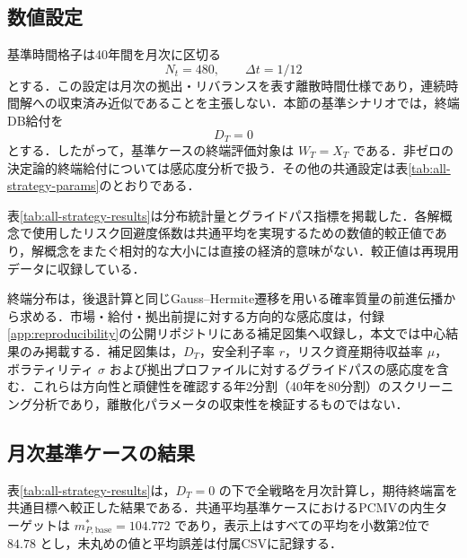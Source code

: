 \documentclass[10pt,a4paper]{article}
\theoremstyle{plain}
\theoremstyle{definition}
\begin{document}
\subsection{数値設定}

基準時間格子は40年間を月次に区切る
\[
  N_t=480,\qquad \Delta t=1/12
\]
とする．この設定は月次の拠出・リバランスを表す離散時間仕様であり，連続時間解への収束済み近似であることを主張しない．本節の基準シナリオでは，終端DB給付を
\[
  D_T=0
\]
とする．したがって，基準ケースの終端評価対象は $W_T=X_T$ である．非ゼロの決定論的終端給付については感応度分析で扱う．その他の共通設定は表\ref{tab:all-strategy-params}のとおりである．



表\ref{tab:all-strategy-results}は分布統計量とグライドパス指標を掲載した．各解概念で使用したリスク回避度係数は共通平均を実現するための数値的較正値であり，解概念をまたぐ相対的な大小には直接の経済的意味がない．較正値は再現用データに収録している．

終端分布は，後退計算と同じGauss--Hermite遷移を用いる確率質量の前進伝播から求める．市場・給付・拠出前提に対する方向的な感応度は，付録\ref{app:reproducibility}の公開リポジトリにある補足図集へ収録し，本文では中心結果のみ掲載する．補足図集は，$D_T$，安全利子率 $r$，リスク資産期待収益率 $\mu$，ボラティリティ $\sigma$ および拠出プロファイルに対するグライドパスの感応度を含む．これらは方向性と頑健性を確認する年2分割（40年を80分割）のスクリーニング分析であり，離散化パラメータの収束性を検証するものではない．

\subsection{月次基準ケースの結果}
\label{sec:monthly-baseline-results}

表\ref{tab:all-strategy-results}は，$D_T=0$ の下で全戦略を月次計算し，期待終端富を共通目標へ較正した結果である．共通平均基準ケースにおけるPCMVの内生ターゲットは $m_{P,\mathrm{base}}^*=104.772$ であり，表示上はすべての平均を小数第2位で $84.78$ とし，未丸めの値と平均誤差は付属CSVに記録する．
\end{document}
